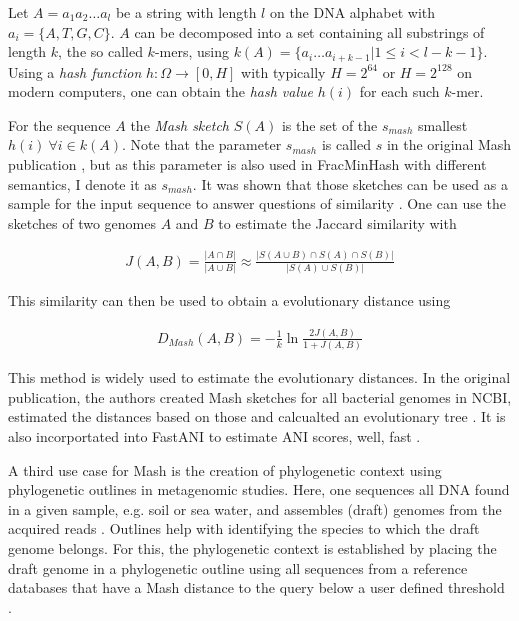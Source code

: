 Let $A = a_1 a_2 \dots a_l$ be a string with length $l$ on the DNA alphabet with
$a_i = \{A, T, G, C\}$. $A$ can be decomposed into a set containing all
substrings of length $k$, the so called $k$-mers, using $k(A) = \{a_i \dots
a_{i+k-1} | 1 \leq i < l-k-1\}$. Using a \textit{hash function} $h: \Omega
\rightarrow [0, H]$ with typically $H=2^{64}$ or $H=2^{128}$ on modern
computers, one can obtain the \textit{hash value} $h(i)$ for each such $k$-mer.

For the sequence $A$ the \textit{Mash sketch} $S(A)$ is the set of the
$s_{mash}$ smallest $h(i) ~ \forall i \in k(A)$. Note that the parameter
$s_{mash}$ is called $s$ in the original Mash publication
\cite{ondovMashFastGenome2016}, but as this parameter is also used in
FracMinHash with different semantics, I denote it as $s_{mash}$. It was shown
that those sketches can be used as a sample for the input sequence to answer
questions of similarity \cite{ondovMashFastGenome2016}. One can use the sketches
of two genomes $A$ and $B$ to estimate the Jaccard similarity with 

\begin{align}
  J(A, B) = \frac{|A \cap B|}{|A \cup B|} \approx \frac{|S(A \cup B) \cap S(A) \cap S(B)|}{|S(A) \cup S(B)|}
\end{align}

This similarity can then be used to obtain a evolutionary distance using

\begin{align}
  D_{Mash}(A,B) = -\frac{1}{k}\ln{\frac{2J(A,B)}{1+J(A,B)}}
\end{align}

This method is widely used to estimate the evolutionary distances. In the
original publication, the authors created Mash sketches for all bacterial
 genomes in NCBI, estimated the
distances based on those and calcualted an evolutionary tree
\cite{ondovMashFastGenome2016}. It is also incorportated into FastANI to
estimate ANI scores, well, fast \cite{jainHighThroughputANI2018}.

A third use case for Mash is the creation of phylogenetic context using
phylogenetic outlines \cite{bagciMicrobialPhylogeneticContext2021} in
metagenomic studies. Here, one sequences all DNA found in a given sample, e.g.
soil or sea water, and assembles (draft) genomes from the acquired reads
\cite{kuninBioinformaticianGuideMetagenomics2008}. Outlines help with
identifying the species to which the draft genome belongs. For this, the
phylogenetic context is established by placing the draft genome in a
phylogenetic outline using all sequences from a reference databases that have a
Mash distance to the query below a user defined threshold
\cite{bagciMicrobialPhylogeneticContext2021}.

